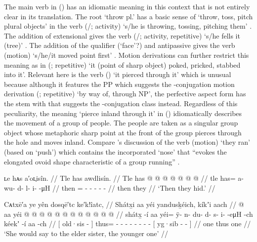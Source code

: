The main verb in (\lastx) has an idiomatic meaning in this context that is not entirely clear in its translation.
The root  ‘throw pl.’ has a basic sense of ‘throw, toss, pitch plural objects’ in the verb  (/;  activity) ‘s/he is throwing, tossing, pitching them’ \parencite[842]{leer:1976}.
The addition of extensional  gives the verb  (/;  activity,  repetitive) ‘s/he fells it (tree)’ \parencite[843]{leer:1976}.
The addition of the qualifier  (‘face’?) and antipassive  gives the verb  (motion) ‘s/he/it moved point first’ \parencite[844]{leer:1976}.
Motion derivations can further restrict this meaning as in  (;  repetitive) ‘it (point of sharp object) poked, pricked, stabbed into it’.
Relevant here is the verb  () ‘it pierced through it’ \parencite[844]{leer:1976} which is unusual because although it features the PP  which suggests the -conjugation motion derivation  (;  repetitive) ‘by way of, through NP’, the perfective aspect form has the stem  with  that suggests the -conjugation class instead.
Regardless of this peculiarity, the meaning ‘pierce inland through it’ in (\lastx) idiomatically describes the movement of a group of people.
The people are taken as a singular group object whose metaphoric sharp point at the front of the group pierces through the hole and moves inland.
Compare \citeauthor{leer:1991}’s discussion of the verb  (motion) ‘they ran’ (based on  ‘push’) which contains the incorporated  ‘nose’ that “evokes the elongated ovoid shape characteristic of a group running” \parencite[51]{leer:1991}.

\ex\label{ex:92-48-they-hid}%
%
\begingl
	\glpreamble	ʟe hᴀs a′oʟ̣isîn. //
	\glpreamble	Tle has awdlisín. //
	\gla	Tle has @  @ {} @ {} @ {} @ {} @ {} @ {} //
	\glb	tle has= a- wu- d- l- i-  -μH //
	\glc	then = - - - -  - //
	\gld	then they  {} {} {} {} {} {} //
	\glft	‘Then they hid.’
		//
\endgl
\xe

\ex\label{ex:92-49-younger-says-to-older}%
%
\begingl
	\glpreamble	Cᴀtxē′a ye yên dosqē′tc ke′k!îatc, //
	\glpreamble	Shátx̱i aa yéi yandusḵéich, kíkʼi aach //
	\gla	{}  @ {} aa {}
		yéi @  @ {} @ {} @ {} @ {} @ {} @ {} @ {} @ {}
		{}  @ {}  @ {} @ {} //
	\glb	{} shátx̱ -í aa {}
		yéi= ÿ- n- du- d- s- i-  -eμH -ch
		{} kéekʼ -í aa -ch {} //
	\glc	{}[ old·sis -  {}]
		thus= - - - - -
			-  - -
		{}[ yg·sib -  - {}] //
	\gld	{}  {} one {}
		thus  {} {} {} {} {} {} {} {}
		{}  {} one {} {} //
	\glft	‘She would say to the elder sister, the younger one’
		//
\endgl
\xe

